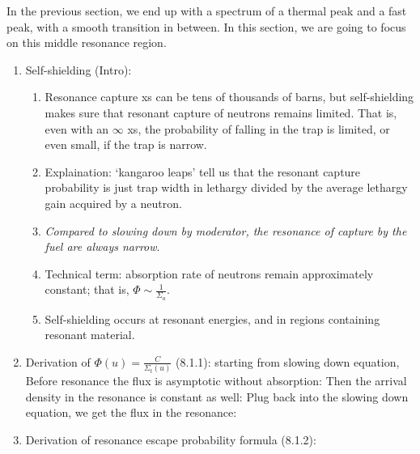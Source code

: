 \documentclass{school-22.211-notes}
\date{February 15, 2012}
\begin{document}
\maketitle

In the previous section, we end up with a spectrum of a thermal peak and a fast peak, with a smooth transition in between. In this section, we are going to focus on this middle resonance region. 


\clearpage
\begin{enumerate}
\item Self-shielding (Intro): 
  \begin{enumerate}
  \item Resonance capture xs can be tens of thousands of barns, but self-shielding makes sure that resonant capture of neutrons remains limited. That is, even with an $\infty$ xs, the probability of falling in the trap is limited, or even small, if the trap is narrow. 
  \item Explaination: `kangaroo leaps' tell us that the resonant capture probability is just trap width in lethargy divided by the average lethargy gain acquired by a neutron. 
  \item \textit{Compared to slowing down by moderator, the resonance of capture by the fuel are always narrow}.
  \item Technical term: absorption rate of neutrons remain approximately constant; that is, $\Phi \sim \frac{1}{\Sigma_a}$. 
  \item Self-shielding occurs at resonant energies, and in regions containing resonant material. 
  \end{enumerate}
\item Derivation of $\Phi(u)  = \frac{C}{\Sigma_t(u)}$ (8.1.1): starting from slowing down equation,
  Before resonance the flux is asymptotic without absorption:
  Then the arrival density in the resonance is constant as well:
  Plug back into the slowing down equation, we get the flux in the resonance:
\item Derivation of resonance escape probability formula (8.1.2): 

\end{enumerate}
\end{document}
